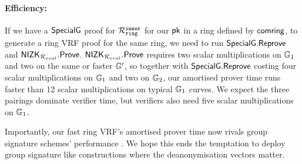 \paragraph{Efficiency:} If we have a ${\mathsf{SpecialG}}$ proof for $\mathcal{R}_{\mathtt{ring}}^{\mathtt{inner}}$ for our $\mathsf{pk}$ in a ring defined by $\mathsf{comring}$, 
to generate a ring VRF proof for the same ring, we need to run ${\mathsf{SpecialG}}.{\mathsf{Reprove}}$ and ${\mathsf{NIZK}}_{\mathcal{R}_{eval}}.{\mathsf{Prove}}$. ${\mathsf{NIZK}}_{\mathcal{R}_{eval}}.{\mathsf{Prove}}$ 
requires two scalar multiplications on ${\mathbb{G}}_1$
and two on the same or faster ${\mathbb{G}}'$,
so together with ${\mathsf{SpecialG}}.{\mathsf{Reprove}}$ costing four scalar multiplications
on ${\mathbb{G}}_1$ and two on ${\mathbb{G}}_2$, our amortised prover time
runs faster than 12 scalar multiplications on typical ${\mathbb{G}}_1$ curves. 
We expect the three pairings dominate verifier time, but
verifiers also need five scalar multiplications on ${\mathbb{G}}_1$.

Importantly, our fast ring VRF's amortised prover time now rivals
group signature schemes' performance \cite{group_sig_survey}.
We hope this ends the temptation to deploy group signature like
 constructions where the deanonymisation vectors matter. 


